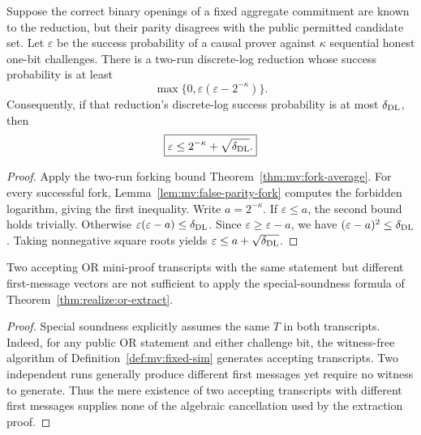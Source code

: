 \begin{theorem}\label{thm:mv:false-parity-bound}
Suppose the correct binary openings
of a fixed aggregate commitment are
known to the reduction, but their
parity disagrees with the public
permitted candidate set. Let
$\varepsilon$ be the success
probability of a causal prover
against $\kappa$ sequential honest
one-bit challenges.
There is a two-run discrete-log
reduction whose success probability
is at least
\[
 \boxed{
 \max\{0,\varepsilon(\varepsilon-2^{-\kappa})\}.}
\]
Consequently, if that reduction's
discrete-log success probability is
at most $\delta_{\rm DL}$, then
\[
 \boxed{\varepsilon\le
 2^{-\kappa}+\sqrt{\delta_{\rm DL}}.}
\]
\end{theorem}
\begin{proof}
Apply the two-run forking bound
Theorem~\ref{thm:mv:fork-average}.
For every successful fork,
Lemma~\ref{lem:mv:false-parity-fork}
computes the forbidden logarithm,
giving the first inequality.
Write $a=2^{-\kappa}$.
If $\varepsilon\le a$, the
second bound holds trivially.
Otherwise
$\varepsilon(\varepsilon-a)
\le\delta_{\rm DL}$.
Since $\varepsilon\ge\varepsilon-a$,
we have
$(\varepsilon-a)^2\le
\delta_{\rm DL}$.
Taking nonnegative square roots
yields $\varepsilon\le a+
\sqrt{\delta_{\rm DL}}$.
\end{proof}

\begin{lemma}\label{lem:mv:fork-needs-same-first}
Two accepting OR mini-proof transcripts
with the same statement but different
first-message vectors are not sufficient
to apply the special-soundness formula
of Theorem~\ref{thm:realize:or-extract}.
\end{lemma}
\begin{proof}
Special soundness explicitly assumes
the same $T$ in both transcripts.
Indeed, for any public OR statement
and either challenge bit, the
witness-free algorithm of
Definition~\ref{def:mv:fixed-sim}
generates accepting transcripts.
Two independent runs generally
produce different first messages
yet require no witness to generate.
Thus the mere existence of two
accepting transcripts with
different first messages supplies
none of the algebraic cancellation
used by the extraction proof.
\end{proof}

